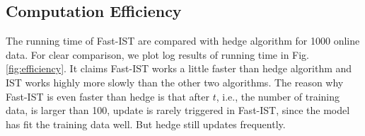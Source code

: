 \documentclass[letterpaper]{article}
\begin{document}
\subsection{Computation Efficiency}
The running time of Fast-IST are compared with hedge algorithm for 1000 online data. For clear comparison, we plot log results of running time in Fig.\ref{fig:efficiency}. It claims Fast-IST works a little faster than hedge algorithm and IST works highly more slowly than the other two algorithms.
The reason why Fast-IST is even faster than hedge is that after $t$, i.e., the number of training data,  is larger than 100, update is rarely triggered in Fast-IST, since the model has fit the training data well. But hedge still updates frequently.

\end{document}
